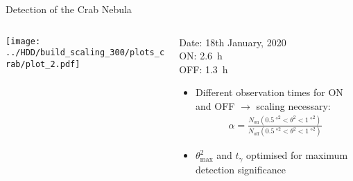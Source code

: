 \begin{frame}{Detection of the Crab Nebula}
    \begin{columns}[onlytextwidth]
        \begin{column}{0.64\textwidth}
            \centering
            \texttt{[image: ../HDD/build\_scaling\_300/plots\_crab/plot\_2.pdf]}
        \end{column}
        \begin{column}{0.35\textwidth}
            \hspace{0.3cm}\textcolor{tugreen}{Date:} 18th January, 2020\\
            \hspace{0.3cm}\textcolor{tugreen}{ON:} \SI{2.6}{\hour}\\
            \hspace{0.3cm}\textcolor{tugreen}{OFF:} \SI{1.3}{\hour}\\
            \medskip
            \begin{itemize}
                \item Different observation times for ON and OFF $\to$ scaling necessary:
                    \begin{align*}
                        \alpha = \frac{N_\text{on}(\SI{0.5}{\degree\squared} < \theta^2 < \SI{1}{\degree\squared})}
                            {N_\text{off}(\SI{0.5}{\degree\squared} < \theta^2 < \SI{1}{\degree\squared})}
                    \end{align*}
                \item $\theta^2_\text{max}$ and $t_\gamma$ optimised for maximum detection significance
            \end{itemize}
        \end{column}
    \end{columns}

\end{frame}

